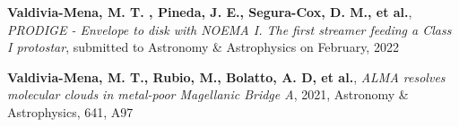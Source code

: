 \vspace{8pt}

\begin{cvitems} %
      \item{\textbf{Valdivia-Mena, M. T. , Pineda, J. E., Segura-Cox, D. M., et al.}, \textit{PRODIGE - Envelope to disk with NOEMA I. The first streamer feeding a Class I protostar}, submitted to Astronomy \& Astrophysics on February, 2022}
      \item{\textbf{Valdivia-Mena, M. T., Rubio, M., Bolatto, A. D, et al.}, \textit{ALMA resolves molecular clouds in metal-poor Magellanic Bridge A}, 2021, Astronomy \& Astrophysics, 641, A97}
\end{cvitems}
\vspace{8pt}